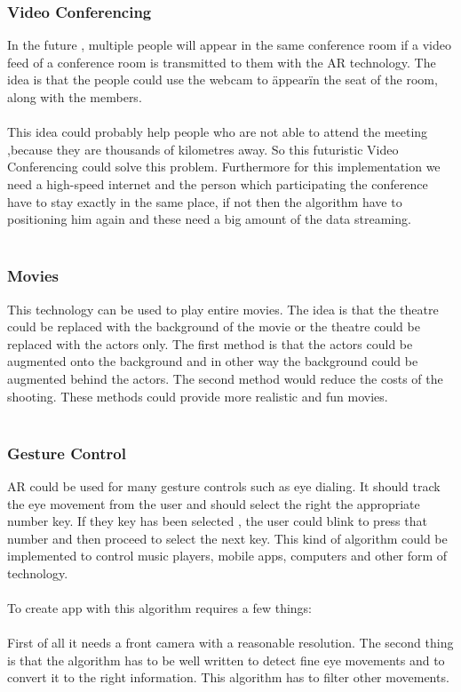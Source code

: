 \subsubsection{Video Conferencing}
In the future , multiple people will appear in the same conference room if a video feed of a conference room is  transmitted to them with the AR technology.  The idea is that the people could use  the webcam to \"appear\" in the seat of the room, along with the members.
\\
\\
This idea could probably help people who are not able to attend the meeting ,because they are thousands of kilometres away. So this futuristic Video Conferencing could solve this problem. Furthermore for this implementation we need a high-speed internet and the person which participating the conference have to stay  exactly in the same place, if not then the algorithm have to positioning him again and these need a big amount of the data streaming.
\\
\\
\subsubsection{Movies}
This technology can be used  to play entire movies.  The idea is that the theatre could be replaced with the background of the movie  or the theatre could be replaced with the actors only.  The first method is that the actors could be augmented onto the background and in  other way the background could be augmented behind the actors. The second method would reduce the costs of the shooting. These methods could provide more realistic and fun movies.
\\
\\
\subsubsection{Gesture Control}
AR could be used for many gesture controls such as eye dialing.   It should track the eye movement from the user and should select the right the appropriate number key. If they key has been selected , the user could blink to press that number and then proceed to select the next key. This kind of algorithm could be implemented to control music players, mobile apps, computers and other form of technology.
\\
\\
To create app with this algorithm requires a few things:
\\
\\
First of all it needs a front camera with a reasonable resolution. The second thing is that the algorithm has to be well written to detect fine eye movements  and to convert it to the right information. This algorithm has to filter other movements.
\\
\\
